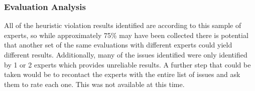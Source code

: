 \documentclass[a4 paper, 12pt]{article}
\begin{document}


    \subsubsection{Evaluation Analysis}
     All of the heuristic violation results identified are according to this sample of experts, so while approximately 75\% may have been collected there is potential that another set of the same evaluations with different experts could yield different results. Additionally, many of the issues identified were only identified by 1 or 2 experts which provides unreliable results. A further step that could be taken would be to recontact the experts with the entire list of issues and ask them to rate each one. This was not available at this time.  
\end{document}
